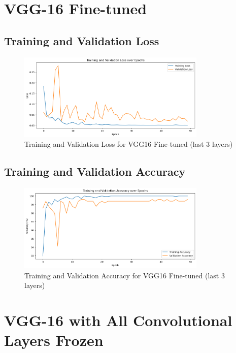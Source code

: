 \section{VGG-16 Fine-tuned}

\subsection{Training and Validation Loss}

\begin{figure}[htbp]
\centering
\includegraphics[width=0.8\textwidth]{train_val_loss_vgg16_uf.png}
\caption{Training and Validation Loss for VGG16 Fine-tuned (last 3 layers)}
\end{figure}

\subsection{Training and Validation Accuracy}

\begin{figure}[htbp]
\centering
\includegraphics[width=0.8\textwidth]{train_val_acc_vgg16_uf.png}
\caption{Training and Validation Accuracy for VGG16 Fine-tuned (last 3 layers)}
\end{figure}

\newpage %

\section{VGG-16 with All Convolutional Layers Frozen}

